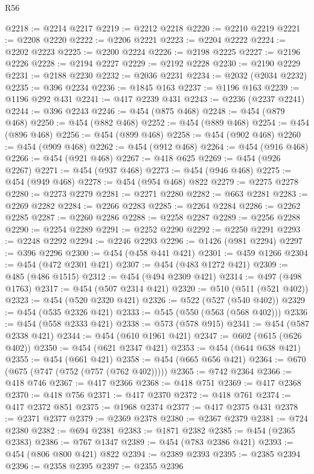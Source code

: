\begin{lexlean}{R56}
\begin{coremodule}
@2218 := @2214 @2217
@2219 := @2212 @2218
@2220 := @2210 @2219
@2221 := @2208 @2220
@2222 := @2206 @2221
@2223 := @2204 @2222
@2224 := @2202 @2223
@2225 := @2200 @2224
@2226 := @2198 @2225
@2227 := @2196 @2226
@2228 := @2194 @2227
@2229 := @2192 @2228
@2230 := @2190 @2229
@2231 := @2188 @2230
@2232 := @2036 @2231
@2234 := @2032 (@2034 @2232)
@2235 := @396 @2234
@2236 := @1845 @163
@2237 := @1196 @163
@2239 := @1196 @292 @431
@2241 := @417 @2239 @431
@2243 := @2236 (@2237 @2241)
@2244 := @396 @2243
@2246 := @454 (@875 @468)
@2248 := @454 (@879 @468)
@2250 := @454 (@882 @468)
@2252 := @454 (@889 @468)
@2254 := @454 (@896 @468)
@2256 := @454 (@899 @468)
@2258 := @454 (@902 @468)
@2260 := @454 (@909 @468)
@2262 := @454 (@912 @468)
@2264 := @454 (@916 @468)
@2266 := @454 (@921 @468)
@2267 := @418 @625
@2269 := @454 (@926 @2267)
@2271 := @454 (@937 @468)
@2273 := @454 (@946 @468)
@2275 := @454 (@949 @468)
@2278 := @454 (@954 @468) @822
@2279 := @2275 @2278
@2280 := @2273 @2279
@2281 := @2271 @2280
@2282 := @663 @2281
@2283 := @2269 @2282
@2284 := @2266 @2283
@2285 := @2264 @2284
@2286 := @2262 @2285
@2287 := @2260 @2286
@2288 := @2258 @2287
@2289 := @2256 @2288
@2290 := @2254 @2289
@2291 := @2252 @2290
@2292 := @2250 @2291
@2293 := @2248 @2292
@2294 := @2246 @2293
@2296 := @1426 (@981 @2294)
@2297 := @396 @2296
@2300 := @454 (@458 @441 @421)
@2301 := @459 @1266
@2304 := @454 (@472 @2301 @421)
@2307 := @454 (@483 @1272 @421)
@2309 := @485 (@486 @1515)
@2312 := @454 (@494 @2309 @421)
@2314 := @497 (@498 @1763)
@2317 := @454 (@507 @2314 @421)
@2320 := @510 (@511 (@521 @402))
@2323 := @454 (@520 @2320 @421)
@2326 := @522 (@527 (@540 @402))
@2329 := @454 (@535 @2326 @421)
@2333 := @545 (@550 (@563 (@568 @402)))
@2336 := @454 (@558 @2333 @421)
@2338 := @573 (@578 @915)
@2341 := @454 (@587 @2338 @421)
@2344 := @454 (@610 @1961 @421)
@2347 := @602 (@615 (@626 @402))
@2350 := @454 (@621 @2347 @421)
@2353 := @454 (@644 @638 @421)
@2355 := @454 (@661 @421)
@2358 := @454 (@665 @656 @421)
@2364 := @670 (@675 (@747 (@752 (@757 (@762 @402)))))
@2365 := @742 @2364
@2366 := @418 @746
@2367 := @417 @2366
@2368 := @418 @751
@2369 := @417 @2368
@2370 := @418 @756
@2371 := @417 @2370
@2372 := @418 @761
@2374 := @417 @2372 @851
@2375 := @1968 @2374
@2377 := @417 @2375 @431
@2378 := @2371 @2377
@2379 := @2369 @2378
@2380 := @2367 @2379
@2381 := @724 @2380
@2382 := @694 @2381
@2383 := @1871 @2382
@2385 := @454 (@2365 @2383)
@2386 := @767 @1347
@2389 := @454 (@783 @2386 @421)
@2393 := @454 (@806 @800 @421) @822
@2394 := @2389 @2393
@2395 := @2385 @2394
@2396 := @2358 @2395
@2397 := @2355 @2396

\end{coremodule}
\end{lexlean}
